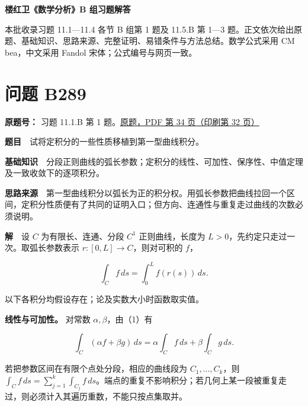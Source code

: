 \documentclass[11pt,a4paper]{article}
\begin{document}
\begin{center}
{\Large\bfseries 楼红卫《数学分析》B 组习题解答\par}
\vspace{7pt}{\large 第四十二批\quad B289—B295\par}
\vspace{5pt}{曲线曲面积分、行列式恒等式与循环常数\par}
\end{center}
本批收录习题 11.1—11.4 各节 B 组第 1 题及 11.5.B 第 1—3 题。正文依次给出原题、基础知识、思路来源、完整证明、易错条件与方法总结。数学公式采用 CM bea，中文采用 Fandol 宋体；公式编号与网页一致。
\begingroup\setlength{\parskip}{0pt}\tableofcontents\endgroup

\section{问题 B289}\label{ux95eeux9898-b289}

\textbf{原题号：} 习题 11.1.B 第 1
题。\href{https://zj139.github.io/math-notes/files/problems/楼分析习题-v2.pdf\#page=34}{原题，PDF
第 34 页（印刷第 32 页）}

\textbf{题目}　试将定积分的一些性质移植到第一型曲线积分。

\textbf{基础知识}　分段正则曲线的弧长参数；定积分的线性、可加性、保序性、中值定理及一致收敛下的逐项积分。

\textbf{思路来源}　第一型曲线积分以弧长为正的积分权。用弧长参数把曲线拉回一个区间，定积分性质便有了共同的证明入口；但方向、连通性与重复走过曲线的次数必须说明。

\textbf{解}　设 \(C\) 为有限长、连通、分段 \(C^1\) 正则曲线，长度为
\(L>0\)，先约定只走过一次。取弧长参数表示 \(r:[0,L]\to C\)，则对可积的
\(f\)，

\begin{equation}
\int_C f\,ds=\int_0^L f(r(s))\,ds.
\tag{1}
\end{equation}

以下各积分均假设存在；论及实数大小时函数取实值。

\textbf{线性与可加性。} 对常数 \(\alpha,\beta\)，由（1）有

\begin{equation}
\int_C(\alpha f+\beta g)\,ds
=\alpha\int_Cf\,ds+\beta\int_Cg\,ds.
\tag{2}
\end{equation}

若把参数区间在有限个点处分段，相应的曲线段为 \(C_1,\ldots,C_k\)，则
\(\int_C f\,ds=\sum_{j=1}^k\int_{C_j}f\,ds\)。端点的重复不影响积分；若几何上某一段被重复走过，则必须计入其遍历重数，不能只按点集取并。
\end{document}
